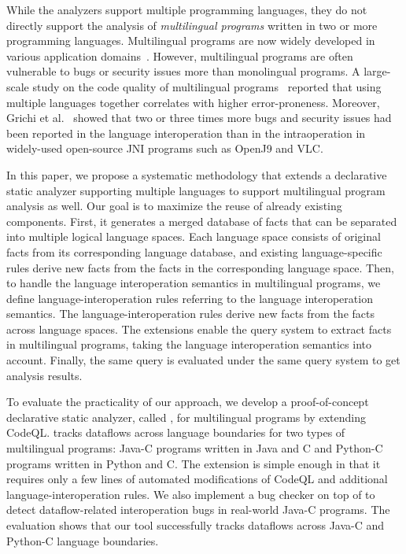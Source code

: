 While the analyzers support multiple programming languages, they do not
directly support the analysis of \textit{multilingual programs} written in two
or more programming languages. 
Multilingual programs are now widely developed in various application
domains~\cite{kochhar2016large, mergendahlcross}. However, multilingual
programs are often vulnerable to bugs or security issues more than monolingual
programs. A large-scale study on the code quality of multilingual
programs~\cite{kochhar2016large} reported that using multiple languages
together correlates with higher error-proneness. Moreover, Grichi et
al.~\cite{grichi2020impact} showed that two or three times more bugs and
security issues had been reported in the language interoperation than in the
intraoperation in widely-used open-source JNI programs such as OpenJ9 and VLC.

In this paper, we propose a systematic methodology that extends a
declarative static analyzer supporting multiple languages to support
multilingual program analysis as well. Our goal is to maximize the reuse of
already existing components. First, it generates a merged database of facts that can
be separated into multiple logical language spaces.  Each language space
consists of original facts from its corresponding language database, and existing
language-specific rules derive new facts from the facts in the corresponding
language space. Then, to handle the language interoperation semantics in
multilingual programs, we define language-interoperation rules referring to
the language interoperation semantics. The language-interoperation rules derive new
facts from the facts across language spaces. The extensions enable the query system
to extract facts in multilingual programs, taking the language
interoperation semantics into account.
Finally, the same query is evaluated under the same query system to get
analysis results.

To evaluate the practicality of our approach, we develop a proof-of-concept
declarative static analyzer, called \ours, for multilingual programs by
extending CodeQL. \ours tracks dataflows across language boundaries for two
types of
multilingual programs: Java-C programs written in Java and C and Python-C
programs written in Python and C. The extension is simple enough in that
it requires only a few lines of automated modifications of CodeQL and additional
language-interoperation rules. We also implement a bug checker on top of
\ours to detect dataflow-related interoperation bugs in real-world Java-C programs.
The evaluation shows that our tool successfully tracks dataflows across
Java-C and Python-C language boundaries. 

